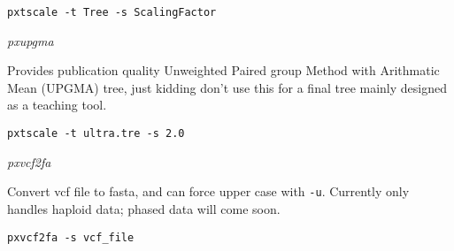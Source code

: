 \documentclass[12pt,letterpaper]{article}
\renewcommand{\subsection}[1]{%
\bigskip
\begin{center}
\begin{large}
\normalfont\itshape #1
\end{large}
\end{center}}
\begin{document}
\begin{flushleft}
\begin{verbatim}
pxtscale -t Tree -s ScalingFactor
\end{verbatim}
\end{flushleft}

\subsection{pxupgma}

Provides publication quality Unweighted Paired group Method with Arithmatic Mean (UPGMA) tree, just kidding don't use this for a final tree mainly designed as a teaching tool.

\begin{flushleft}
\begin{verbatim}
pxtscale -t ultra.tre -s 2.0
\end{verbatim}
\end{flushleft}

\subsection{pxvcf2fa}
Convert vcf file to fasta, and can force upper case with \texttt{-u}.
Currently only handles haploid data; phased data will come soon.

\begin{flushleft}
\begin{verbatim}
pxvcf2fa -s vcf_file
\end{verbatim}
\end{flushleft}
\end{document}
